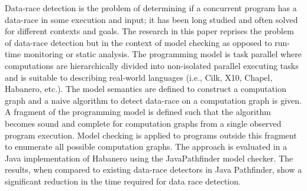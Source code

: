 Data-race detection is the problem of determining if a concurrent program has a data-race in some execution and input; it has been long studied and often solved for different contexts and goals. The research in this paper reprises the problem of data-race detection but in the context of model checking as opposed to run-time monitoring or static analysis. The programming model is task parallel where computations are hierarchically divided into non-isolated parallel executing tasks and is suitable to describing real-world languages (i.e., Cilk, X10, Chapel, Habanero, etc.). The model semantics are defined to construct a computation graph and a naive algorithm to detect data-race on a computation graph is given. A fragment of the programming model is defined such that the algorithm becomes sound and complete for computation graphs from a single observed program execution. Model checking is applied to programs outside this fragment to enumerate all possible computation graphs. The approach is evaluated in a Java implementation of Habanero using the JavaPathfinder model checker. The results, when compared to existing data-race detectors in Java Pathfinder, show a significant reduction in the time required for data race detection.

